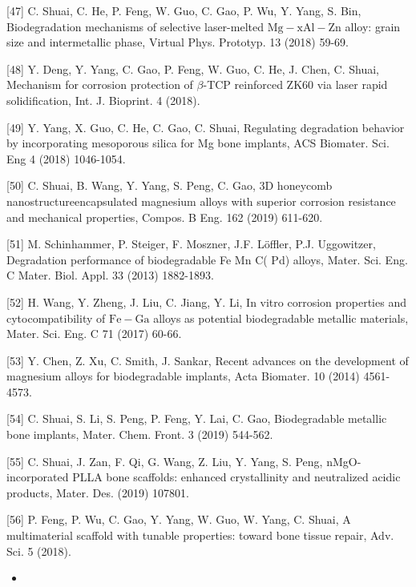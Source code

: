\documentclass[10pt]{article}
\begin{document}
[47] C. Shuai, C. He, P. Feng, W. Guo, C. Gao, P. Wu, Y. Yang, S. Bin, Biodegradation mechanisms of selective laser-melted $\mathrm{Mg}-\mathrm{x} \mathrm{Al}-\mathrm{Zn}$ alloy: grain size and intermetallic phase, Virtual Phys. Prototyp. 13 (2018) 59-69.

[48] Y. Deng, Y. Yang, C. Gao, P. Feng, W. Guo, C. He, J. Chen, C. Shuai, Mechanism for corrosion protection of $\beta$-TCP reinforced ZK60 via laser rapid solidification, Int. J. Bioprint. 4 (2018).

[49] Y. Yang, X. Guo, C. He, C. Gao, C. Shuai, Regulating degradation behavior by incorporating mesoporous silica for Mg bone implants, ACS Biomater. Sci. Eng 4 (2018) 1046-1054.

[50] C. Shuai, B. Wang, Y. Yang, S. Peng, C. Gao, 3D honeycomb nanostructureencapsulated magnesium alloys with superior corrosion resistance and mechanical properties, Compos. B Eng. 162 (2019) 611-620.

[51] M. Schinhammer, P. Steiger, F. Moszner, J.F. Löffler, P.J. Uggowitzer, Degradation performance of biodegradable Fe Mn C( Pd) alloys, Mater. Sci. Eng. C Mater. Biol. Appl. 33 (2013) 1882-1893.

[52] H. Wang, Y. Zheng, J. Liu, C. Jiang, Y. Li, In vitro corrosion properties and cytocompatibility of $\mathrm{Fe}-\mathrm{Ga}$ alloys as potential biodegradable metallic materials, Mater. Sci. Eng. C 71 (2017) 60-66.

[53] Y. Chen, Z. Xu, C. Smith, J. Sankar, Recent advances on the development of magnesium alloys for biodegradable implants, Acta Biomater. 10 (2014) 4561-4573.

[54] C. Shuai, S. Li, S. Peng, P. Feng, Y. Lai, C. Gao, Biodegradable metallic bone implants, Mater. Chem. Front. 3 (2019) 544-562.

[55] C. Shuai, J. Zan, F. Qi, G. Wang, Z. Liu, Y. Yang, S. Peng, nMgO-incorporated PLLA bone scaffolds: enhanced crystallinity and neutralized acidic products, Mater. Des. (2019) 107801.

[56] P. Feng, P. Wu, C. Gao, Y. Yang, W. Guo, W. Yang, C. Shuai, A multimaterial scaffold with tunable properties: toward bone tissue repair, Adv. Sci. 5 (2018).

\begin{itemize}
  \item 
\end{itemize}
\end{document}
